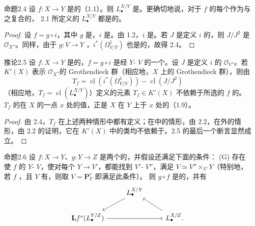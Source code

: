 \begin{SGAresult}{命题}{2.4}
设 $f:X\to Y$ 是的（1.1）。则 $L^{X/Y}_\bullet$ 是。更确切地说，对于 $f$ 的每个作为与之复合的，
2.1 所定义的 $L^{X/Y}_\bullet$ 都是的。
\end{SGAresult}
\begin{proof}
设 $f=g\circ i$，其中 $g$ 是，$i$ 是。由 1.2，$i$ 是。若 $J$ 是定义 $i$ 的，则 $J/J^2$ 是 $\mathscr O_X$-。同样，由于 $g:V\to Y$ ，$i^*(\Omega^1_{V/Y})$ 也是的，故得 2.4。
\end{proof}
\begin{SGAresult}{推论}{2.5}
设 $f:X\to Y$ 是的，$f=g\circ i$ 是经 $Y$- $V$ 的一个。设 $J$ 是定义 $i$ 的 $\mathscr O_V$-。若 $K'(X)$ 表示 $\mathscr O_X$-的 Grothendieck 群（相应地，$X$ 上的 Grothendieck 群），则由
\[T_f=\operatorname{cl}(i^*(\Omega^1_{V/Y}))-\operatorname{cl}(J/J^2)\]
（相应地，$T_f=\operatorname{cl}(L^{X/Y}_\bullet)$）定义的元素 $T_f\in K'(X)$ 不依赖于所选的 $f$ 的。$T_f$ 的在 $X$ 的一点 $x$ 处的值，正是 $X$ 在 $Y$ 上于 $x$ 处的（1.9）。
\end{SGAresult}
\begin{proof}
由 2.4，$T_f$ 在上述两种情形中都有定义；在中的情形，由 2.2，在外的情形，由 2.2 的证明，它在 $K'(X)$ 中的类均不依赖于。2.5 的最后一个断言显然成立。
\end{proof}
\begin{SGAresult}{命题}{2.6}
设 $f:X\to Y$、$g:Y\to Z$ 是两个的，并假设还满足下面的条件：
\textup{(G)} 存在使 $f$ 的 $Y$- $V$，使对每个 $Y\to V'$，都能找到 $V'$- $V''$，满足 $V\simeq V''\times_{V'}Y$（特别地，若 $f$ ，且 $Y$ 有，则取 $V=\mathbf P^r_Y$ 即满足此条件）。
则 $g\circ f$ 是的，并有
\[
\begin{tikzcd}&L^{X/Y}_\bullet\arrow[dl]\\\mathbf Lf^*(L^{Y/Z}_\bullet)\arrow[rr]&&L^{X/Z}_\bullet\arrow[ul].\end{tikzcd}
\]
\end{SGAresult}
